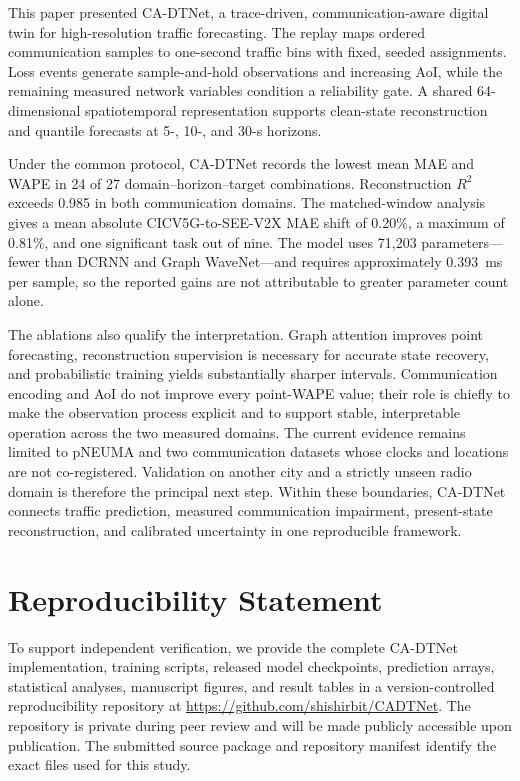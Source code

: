 \documentclass[pdflatex,sn-mathphys-num]{sn-jnl}%
\newenvironment{changed}{\color{blue}}{}
\theoremstyle{thmstyleone}%
\theoremstyle{thmstyletwo}%
\theoremstyle{thmstylethree}%
\begin{document}
\begin{changed}
This paper presented CA-DTNet, a trace-driven, communication-aware digital twin for high-resolution traffic forecasting. The replay maps ordered communication samples to one-second traffic bins with fixed, seeded assignments. Loss events generate sample-and-hold observations and increasing AoI, while the remaining measured network variables condition a reliability gate. A shared 64-dimensional spatiotemporal representation supports clean-state reconstruction and quantile forecasts at 5-, 10-, and 30-s horizons.

Under the common protocol, CA-DTNet records the lowest mean MAE and WAPE in 24 of 27 domain--horizon--target combinations. Reconstruction \(R^{2}\) exceeds 0.985 in both communication domains. The matched-window analysis gives a mean absolute CICV5G-to-SEE-V2X MAE shift of 0.20\%, a maximum of 0.81\%, and one significant task out of nine. The model uses 71,203 parameters---fewer than DCRNN and Graph WaveNet---and requires approximately 0.393~ms per sample, so the reported gains are not attributable to greater parameter count alone.

The ablations also qualify the interpretation. Graph attention improves point forecasting, reconstruction supervision is necessary for accurate state recovery, and probabilistic training yields substantially sharper intervals. Communication encoding and AoI do not improve every point-WAPE value; their role is chiefly to make the observation process explicit and to support stable, interpretable operation across the two measured domains. The current evidence remains limited to pNEUMA and two communication datasets whose clocks and locations are not co-registered. Validation on another city and a strictly unseen radio domain is therefore the principal next step. Within these boundaries, CA-DTNet connects traffic prediction, measured communication impairment, present-state reconstruction, and calibrated uncertainty in one reproducible framework.
\end{changed}

\section*{Reproducibility Statement}

To support independent verification, we provide the complete CA-DTNet
implementation, training scripts, released model checkpoints, prediction
arrays, statistical analyses, manuscript figures, and result tables in a
version-controlled reproducibility repository at
\url{https://github.com/shishirbit/CADTNet}. The repository is private during
peer review and will be made publicly accessible upon publication. The
submitted source package and repository manifest identify the exact files used
for this study.
\end{document}
